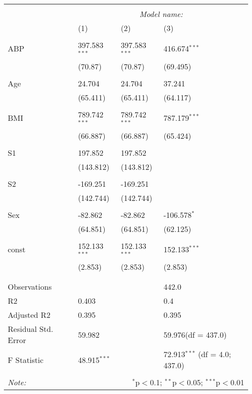 \documentclass[12pt]{article}
\numberwithin{equation}{subsection}
\begin{document}
\begin{table}[!htbp] \centering
  \label{}
\begin{tabularx}{\textwidth}{lXXX}
\\[-1.8ex]\hline
\hline \\[-1.8ex]
& \multicolumn{3}{c}{\textit{Model name:}} \
\cr \cline{3-4}
\\[-1.8ex] & (1) & (2) & (3) \\
\hline \\[-1.8ex]
 ABP & 397.583$^{***}$ & 397.583$^{***}$ & 416.674$^{***}$ \\
  & (70.87) & (70.87) & (69.495) \\
  & & & \\
 Age & 24.704$^{}$ & 24.704$^{}$ & 37.241$^{}$ \\
  & (65.411) & (65.411) & (64.117) \\
  & & & \\
 BMI & 789.742$^{***}$ & 789.742$^{***}$ & 787.179$^{***}$ \\
  & (66.887) & (66.887) & (65.424) \\
  & & & \\
 S1 & 197.852$^{}$ & 197.852$^{}$ & \\
  & (143.812) & (143.812) & \\
  & & & \\
 S2 & -169.251$^{}$ & -169.251$^{}$ & \\
  & (142.744) & (142.744) & \\
  & & & \\
 Sex & -82.862$^{}$ & -82.862$^{}$ & -106.578$^{*}$ \\
  & (64.851) & (64.851) & (62.125) \\
  & & & \\
 const & 152.133$^{***}$ & 152.133$^{***}$ & 152.133$^{***}$ \\
  & (2.853) & (2.853) & (2.853) \\
  & & & \\
\hline \\[-1.8ex]
 Observations &   &   & 442.0 \\
 R${2}$ & 0.403 &   & 0.4 \\
 Adjusted R${2}$ & 0.395 &   & 0.395 \\
 Residual Std. Error & 59.982 &   & 59.976(df = 437.0)  \\
 F Statistic & 48.915$^{***}$  &     & 72.913$^{***}$ (df = 4.0; 437.0) \\
\hline
\hline \\[-1.8ex]
\textit{Note:} & \multicolumn{3}{r}{$^{*}$p$<$0.1; $^{**}$p$<$0.05; $^{***}$p$<$0.01} \\
\end{tabularx}
\end{table}
\end{document}
